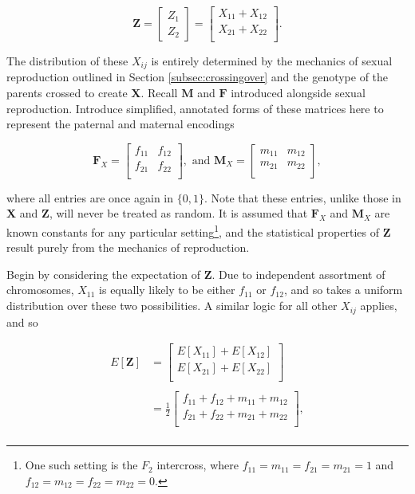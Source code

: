 \documentclass{article}
\newcommand{\ve}[1]{\mathbf{#1}}           %
\newcommand{\m}[1]{\mathbf{#1}}               %
\begin{document}
$$\ve{Z} = \begin{bmatrix} Z_1 \\ Z_2 \end{bmatrix} = \begin{bmatrix}
  X_{11} + X_{12} \\
  X_{21} + X_{22} \\
\end{bmatrix}.$$

\noindent The distribution of these $X_{ij}$ is entirely determined by the mechanics of sexual reproduction outlined in Section \ref{subsec:crossingover} and the genotype of the parents crossed to create $\m{X}$. Recall $\m{M}$ and $\m{F}$ introduced alongside sexual reproduction. Introduce simplified, annotated forms of these matrices here to represent the paternal and maternal encodings

$$\m{F}_X = \begin{bmatrix}
  f_{11} & f_{12} \\
  f_{21} & f_{22} \\
\end{bmatrix}, \text{ and }
\m{M}_X = \begin{bmatrix}
  m_{11} & m_{12} \\
  m_{21} & m_{22} \\
\end{bmatrix},$$

\noindent where all entries are once again in $\{0,1\}$. Note that these entries, unlike those in $\m{X}$ and $\ve{Z}$, will never be treated as random. It is assumed that $\m{F}_X$ and $\m{M}_X$ are known constants for any particular setting\footnote{One such setting is the $F_2$ intercross, where $f_{11} = m_{11} = f_{21} = m_{21} = 1$ and $f_{12} = m_{12} = f_{22} = m_{22} = 0$.}, and the statistical properties of $\ve{Z}$ result purely from the mechanics of reproduction.

Begin by considering the expectation of $\ve{Z}$. Due to independent assortment of chromosomes, $X_{11}$ is equally likely to be either $f_{11}$ or $f_{12}$, and so takes a uniform distribution over these two possibilities. A similar logic for all other $X_{ij}$ applies, and so

\begin{equation*}
  \begin{split}
    E[\ve{Z}] & = {\begin{bmatrix}
        E[X_{11}] + E[X_{12}] \\
        E[X_{21}] + E[X_{22}] \\
      \end{bmatrix}} \\
    & \\
    & = {\frac{1}{2}\begin{bmatrix}
        f_{11} + f_{12} + m_{11} + m_{12} \\
        f_{21} + f_{22} + m_{21} + m_{22} \\
      \end{bmatrix}}, \\
  \end{split}
\end{equation*}
\end{document}
